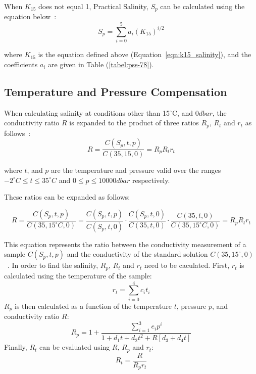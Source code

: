 When $K_{15}$ does not equal 1, Practical Salinity, $S_p$ can be calculated using the equation below~\cite{teos-10}: 
\begin{equation}\label{eqn:salinity_short}
    S_p = \sum_{i=0}^{5}a_i{(K_{15})}^{i/2} 
\end{equation}

where $K_{15}$ is the equation defined above (Equation~\ref{eqn:k15_salinity}), and the coefficients $a_i$ are given in Table (\ref{tabel:pss-78}).


\subsection{Temperature and Pressure Compensation}
When calculating salinity at conditions other than 15$^\circ$C, and $0dbar$, the conductivity ratio $R$ is expanded to the product of three ratios $R_p$, $R_t$ and $r_t$ as follows~\cite{teos-10}:
\begin{equation}
    R=\frac{C(S_p, t, p)}{C(35, 15, 0)} = R_p R_t r_t
\end{equation}

where $t$, and $p$ are the temperature and pressure valid over the ranges $-2^{\circ}C \leq t \leq 35^{\circ}C$ and $0 \leq p \leq 10 000dbar$ respectively.

These ratios can be expanded as follows:

\begin{equation}
    R = \frac{C(S_p, t, p)}{C(35, 15^{\circ} C, 0)} = \frac{C(S_p, t, p)}{C(S_p, t, 0)} \cdot \frac{C(S_p, t, 0)}{C(35, t, 0)} \cdot \frac{C(35, t, 0)}{C(35, 15^{\circ} C, 0)} = R_p R_t r_t
\end{equation}

This equation represents the ratio between the conductivity measurement of a sample $C(S_p,t,p)$ and the conductivity of the standard solution $C(35, 15^{\circ}, 0)$~\cite{teos-10}. 
In order to find the salinity, $R_p$, $R_t$ and $r_t$ need to be caculated.
First, $r_t$ is calculated using the temperature of the sample:
\begin{equation}
    r_t = \sum_{i=0}^{4} {c_i}{t_i}
\end{equation}
$R_p$ is then calculated as a function of the temperature $t$, pressure $p$, and conductivity ratio $R$:
\begin{equation}
    R_p = 1 + \frac{\sum_{i=1}^{3}{e_i}{p^i}}{1+d_1{t}+d_2{t^2}+R[d_3+d_4 {t}]}
\end{equation}
Finally, $R_t$ can be evaluated using $R$, $R_p$ and $r_t$:
\begin{equation}
    R_t = \frac{R}{{R_p}{r_t}}
\end{equation} 

